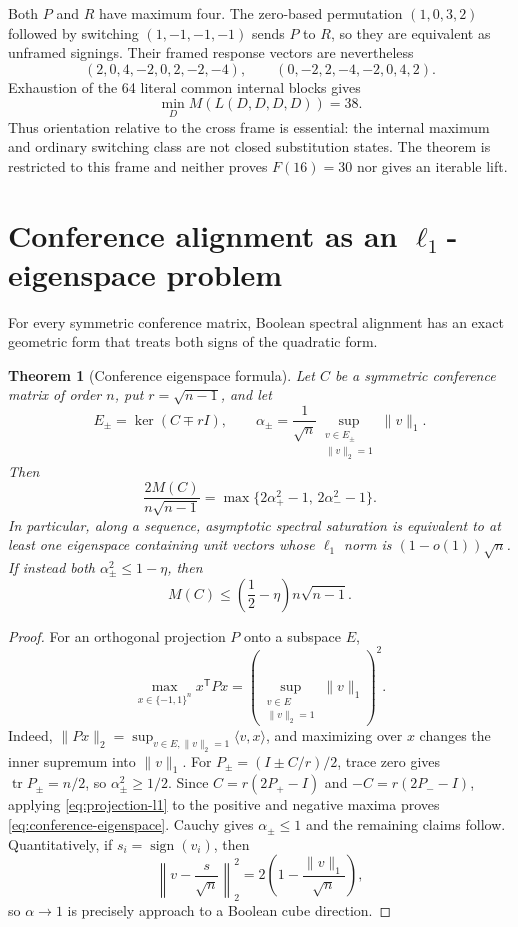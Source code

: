 \documentclass[11pt]{article}
\newtheorem{theorem}{Theorem}
\newcommand{\eps}{\{-1,1\}}
\begin{document}
Both $P$ and $R$ have maximum four. The zero-based permutation
$(1,0,3,2)$ followed by switching $(1,-1,-1,-1)$ sends $P$ to $R$, so they
are equivalent as unframed signings. Their framed response vectors are
nevertheless
\[
 (2,0,4,-2,0,2,-2,-4),\qquad
 (0,-2,2,-4,-2,0,4,2).
\]
Exhaustion of the 64 literal common internal blocks gives
\[
 \min_D M(L(D,D,D,D))=38.
\]
Thus orientation relative to the cross frame is essential: the internal
maximum and ordinary switching class are not closed substitution states. The
theorem is restricted to this frame and neither proves $F(16)=30$ nor gives
an iterable lift.

\section{Conference alignment as an \texorpdfstring{$\ell_1$}{l1}-eigenspace problem}

For every symmetric conference matrix, Boolean spectral alignment has an
exact geometric form that treats both signs of the quadratic form.

\begin{theorem}[Conference eigenspace formula]
\label{thm:conference-eigenspace}
Let $C$ be a symmetric conference matrix of order $n$, put
$r=\sqrt{n-1}$, and let
\[
 E_\pm=\ker(C\mp rI),\qquad
 \alpha_\pm=\frac1{\sqrt n}
 \sup_{\substack{v\in E_\pm\\\|v\|_2=1}}\|v\|_1.
\]
Then
\begin{equation}
 \frac{2M(C)}{n\sqrt{n-1}}
 =\max\{2\alpha_+^2-1,\,2\alpha_-^2-1\}.
 \label{eq:conference-eigenspace}
\end{equation}
In particular, along a sequence, asymptotic spectral saturation is equivalent
to at least one eigenspace containing unit vectors whose $\ell_1$ norm is
$(1-o(1))\sqrt n$.
If instead both $\alpha_\pm^2\le1-\eta$, then
\[
 M(C)\le\left(\frac12-\eta\right)n\sqrt{n-1}.
\]
\end{theorem}

\begin{proof}
For an orthogonal projection $P$ onto a subspace $E$,
\begin{equation}
 \max_{x\in\eps^n}x^{\mathsf T}Px
 =\left(\sup_{\substack{v\in E\\\|v\|_2=1}}\|v\|_1\right)^2.
 \label{eq:projection-l1}
\end{equation}
Indeed,
$\|Px\|_2=\sup_{v\in E,\|v\|_2=1}\langle v,x\rangle$, and maximizing over
$x$ changes the inner supremum into $\|v\|_1$.  For
$P_\pm=(I\pm C/r)/2$, trace zero gives
$\operatorname{tr}P_\pm=n/2$, so $\alpha_\pm^2\ge1/2$.  Since
$C=r(2P_+-I)$ and $-C=r(2P_--I)$, applying
\eqref{eq:projection-l1} to the positive and negative maxima proves
\eqref{eq:conference-eigenspace}.  Cauchy gives $\alpha_\pm\le1$ and the
remaining claims follow.  Quantitatively, if $s_i=\operatorname{sign}(v_i)$,
then
\[
 \left\|v-\frac{s}{\sqrt n}\right\|_2^2
 =2\left(1-\frac{\|v\|_1}{\sqrt n}\right),
\]
so $\alpha\to1$ is precisely approach to a Boolean cube direction.
\end{proof}
\end{document}
